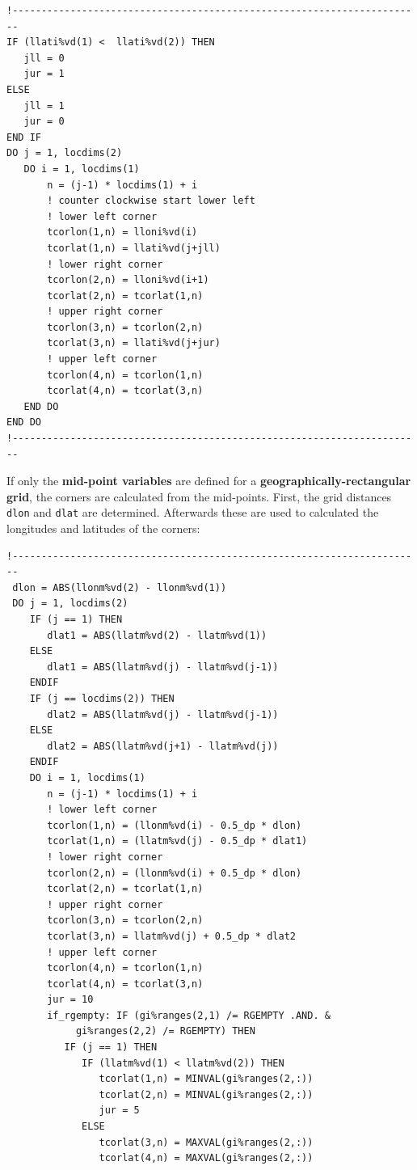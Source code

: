 \documentclass[11pt,twoside]{article}
\begin{document}
\begin{enumerate}
\begin{itemize}
\begin{itemize}
\begin{verbatim}
!-----------------------------------------------------------------------
IF (llati%vd(1) <  llati%vd(2)) THEN
   jll = 0
   jur = 1
ELSE
   jll = 1
   jur = 0
END IF
DO j = 1, locdims(2)
   DO i = 1, locdims(1)
       n = (j-1) * locdims(1) + i
       ! counter clockwise start lower left
       ! lower left corner
       tcorlon(1,n) = lloni%vd(i)  
       tcorlat(1,n) = llati%vd(j+jll) 
       ! lower right corner
       tcorlon(2,n) = lloni%vd(i+1) 
       tcorlat(2,n) = tcorlat(1,n)
       ! upper right corner
       tcorlon(3,n) = tcorlon(2,n) 
       tcorlat(3,n) = llati%vd(j+jur) 
       ! upper left corner
       tcorlon(4,n) = tcorlon(1,n)
       tcorlat(4,n) = tcorlat(3,n)
   END DO
END DO
!-----------------------------------------------------------------------
\end{verbatim}
If only the {\bf mid-point variables} are defined for a {\bf
geographically-rectangular grid}, the corners are calculated from the
mid-points. First, the grid distances \verb|dlon| and \verb|dlat| are
determined. Afterwards these are used to calculated the longitudes and
latitudes of the corners:
\begin{verbatim}
!-----------------------------------------------------------------------
 dlon = ABS(llonm%vd(2) - llonm%vd(1))
 DO j = 1, locdims(2)
    IF (j == 1) THEN
       dlat1 = ABS(llatm%vd(2) - llatm%vd(1))
    ELSE
       dlat1 = ABS(llatm%vd(j) - llatm%vd(j-1))
    ENDIF
    IF (j == locdims(2)) THEN
       dlat2 = ABS(llatm%vd(j) - llatm%vd(j-1))
    ELSE
       dlat2 = ABS(llatm%vd(j+1) - llatm%vd(j))
    ENDIF
    DO i = 1, locdims(1)
       n = (j-1) * locdims(1) + i
       ! lower left corner
       tcorlon(1,n) = (llonm%vd(i) - 0.5_dp * dlon)  
       tcorlat(1,n) = (llatm%vd(j) - 0.5_dp * dlat1) 
       ! lower right corner
       tcorlon(2,n) = (llonm%vd(i) + 0.5_dp * dlon)   
       tcorlat(2,n) = tcorlat(1,n)
       ! upper right corner
       tcorlon(3,n) = tcorlon(2,n)   
       tcorlat(3,n) = llatm%vd(j) + 0.5_dp * dlat2 
       ! upper left corner
       tcorlon(4,n) = tcorlon(1,n)
       tcorlat(4,n) = tcorlat(3,n)
       jur = 10
       if_rgempty: IF (gi%ranges(2,1) /= RGEMPTY .AND. &
            gi%ranges(2,2) /= RGEMPTY) THEN
          IF (j == 1) THEN
             IF (llatm%vd(1) < llatm%vd(2)) THEN
                tcorlat(1,n) = MINVAL(gi%ranges(2,:))
                tcorlat(2,n) = MINVAL(gi%ranges(2,:))
                jur = 5
             ELSE
                tcorlat(3,n) = MAXVAL(gi%ranges(2,:))
                tcorlat(4,n) = MAXVAL(gi%ranges(2,:))

\end{verbatim}
\end{itemize}
\end{itemize}
\end{enumerate}
\end{document}
